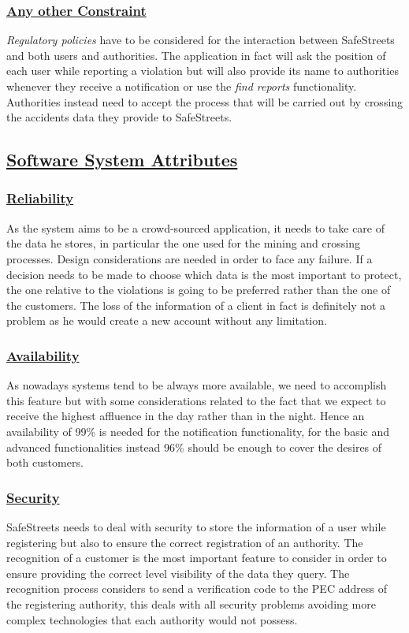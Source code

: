 		\subsubsection[Any other Constraint]{\hyperlink{toc}{Any other Constraint}}
			\emph{Regulatory policies}  have to be considered for the interaction between SafeStreets and both users and authorities. The application in fact will ask the position of each user while reporting a violation but will also provide its name to authorities whenever they receive a notification or use the \emph{find reports} functionality.
			Authorities instead need to accept the process that will be carried out by crossing  the accidents data they provide to SafeStreets.
	
	\subsection[Software System Attributes]{\hyperlink{toc}{Software System Attributes}}
		\subsubsection[Reliability]{\hyperlink{toc}{Reliability}}
			As the system aims to be a crowd-sourced application, it needs to take care of the data he stores, in particular the one used for the mining and crossing processes. Design considerations are needed in order to face any failure. If a decision needs to be made to choose which data is the most important to protect, the one relative to the violations is going to be preferred rather than the one of the customers. The loss of the information of a client in fact is definitely not a problem as he would create a new account without any limitation.
		\subsubsection[Availability]{\hyperlink{toc}{Availability}}
			As nowadays systems tend to be always more available, we need to accomplish this feature but with some considerations related to the fact that we expect to receive the highest affluence in the day rather than in the night. Hence an availability of 99\% is needed for the notification functionality, for the basic and advanced functionalities instead 96\% should be enough to cover the desires of both customers.
		\subsubsection[Security]{\hyperlink{toc}{Security}}
			SafeStreets needs to deal with security to store the information of a user while registering but also to ensure the correct registration of an authority. The recognition of a customer is the most important feature to consider in order to ensure providing the correct level visibility of the data they query. The recognition process considers to send a verification code to the PEC address of the registering authority, this deals with all security problems avoiding more complex technologies that each authority would not possess.
